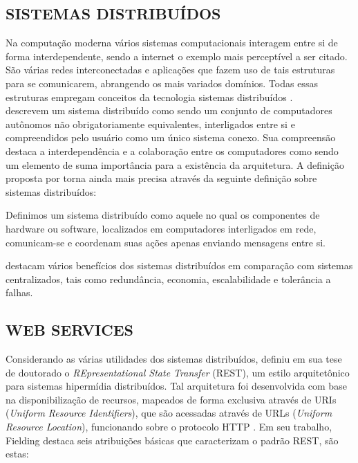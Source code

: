 \subsection{SISTEMAS DISTRIBUÍDOS}

Na computação moderna vários sistemas computacionais interagem entre si de forma interdependente, sendo a internet o exemplo mais perceptível a ser citado. São várias redes interconectadas e aplicações que fazem uso de tais estruturas para se comunicarem, abrangendo os mais variados domínios. Todas essas estruturas empregam conceitos da tecnologia sistemas distribuídos \cite{puder2011distributed}.\\
 descrevem um sistema distribuído como sendo um conjunto de computadores autônomos não obrigatoriamente equivalentes, interligados entre si e compreendidos pelo usuário como um único sistema conexo. Sua compreensão destaca a interdependência e a colaboração entre os computadores como sendo um elemento de suma importância para a existência da arquitetura. A definição proposta por  torna ainda mais precisa através da seguinte definição sobre sistemas distribuídos:

\begin{citacao}
	Definimos um sistema distribuído como aquele no qual os componentes de hardware ou software, localizados em computadores interligados em rede, comunicam-se e coordenam suas ações apenas enviando mensagens entre si.
\end{citacao}

 destacam vários benefícios dos sistemas distribuídos em comparação com sistemas centralizados, tais como redundância, economia, escalabilidade e tolerância a falhas.

\subsection{WEB SERVICES}

Considerando as várias utilidades dos sistemas distribuídos,  definiu em sua tese de doutorado o \textit{REpresentational State Transfer} (REST), um estilo arquitetônico para sistemas hipermídia distribuídos. Tal arquitetura foi desenvolvida com base na disponibilização de recursos, mapeados de forma exclusiva através de URIs (\textit{Uniform Resource Identifiers}), que são acessadas através de URLs (\textit{Uniform Resource Location}), funcionando sobre o protocolo HTTP \cite{richardson2008restful}. Em seu trabalho, Fielding destaca seis atribuições básicas que caracterizam o padrão REST, são estas:

